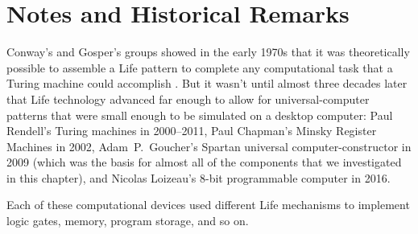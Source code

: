 

\section{Notes and Historical Remarks}\label{sec:universal_computation_history}


Conway's and Gosper's groups showed in the early 1970s that it was theoretically possible to assemble a Life pattern to complete any computational task that a Turing machine could accomplish \cite{Wain74,BCG82}. But it wasn't until almost three decades later that Life technology advanced far enough to allow for universal-computer patterns that were small enough to be simulated on a desktop computer: Paul Rendell's Turing machines in 2000--2011, Paul Chapman's Minsky Register Machines in 2002, Adam~P.~Goucher's Spartan universal computer-constructor in 2009 \cite{Gou10} (which was the basis for almost all of the components that we investigated in this chapter), and Nicolas Loizeau's 8-bit programmable computer in 2016.

Each of these computational devices used different Life mechanisms to implement logic gates, memory, program storage, and so on.





